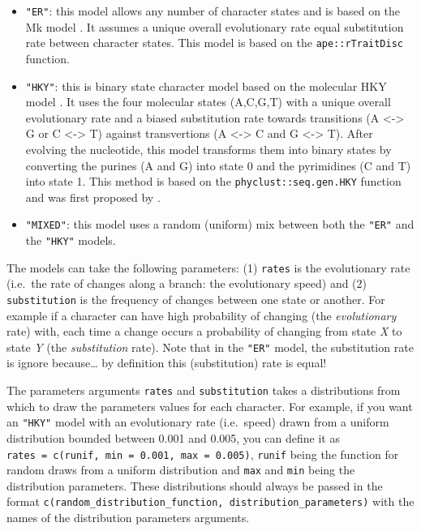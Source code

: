 \documentclass[]{book}
\providecommand{\tightlist}{%
  \setlength{\itemsep}{0pt}\setlength{\parskip}{0pt}}
\begin{document}
\begin{itemize}
\tightlist
\item
  \texttt{"ER"}: this model allows any number of character states and is based on the Mk model \citep{lewisa2001}. It assumes a unique overall evolutionary rate equal substitution rate between character states. This model is based on the \texttt{ape::rTraitDisc} function.
\item
  \texttt{"HKY"}: this is binary state character model based on the molecular HKY model \citep{HKY85}. It uses the four molecular states (A,C,G,T) with a unique overall evolutionary rate and a biased substitution rate towards transitions (A \textless{}-\textgreater{} G or C \textless{}-\textgreater{} T) against transvertions (A \textless{}-\textgreater{} C and G \textless{}-\textgreater{} T). After evolving the nucleotide, this model transforms them into binary states by converting the purines (A and G) into state 0 and the pyrimidines (C and T) into state 1. This method is based on the \texttt{phyclust::seq.gen.HKY} function and was first proposed by \citet{OReilly2016}.
\item
  \texttt{"MIXED"}: this model uses a random (uniform) mix between both the \texttt{"ER"} and the \texttt{"HKY"} models.
\end{itemize}

The models can take the following parameters:
(1) \texttt{rates} is the evolutionary rate (i.e.~the rate of changes along a branch: the evolutionary speed) and (2) \texttt{substitution} is the frequency of changes between one state or another.
For example if a character can have high probability of changing (the \emph{evolutionary} rate) with, each time a change occurs a probability of changing from state \emph{X} to state \emph{Y} (the \emph{substitution} rate).
Note that in the \texttt{"ER"} model, the substitution rate is ignore because\ldots{} by definition this (substitution) rate is equal!

The parameters arguments \texttt{rates} and \texttt{substitution} takes a distributions from which to draw the parameters values for each character.
For example, if you want an \texttt{"HKY"} model with an evolutionary rate (i.e.~speed) drawn from a uniform distribution bounded between 0.001 and 0.005, you can define it as \texttt{rates\ =\ c(runif,\ min\ =\ 0.001,\ max\ =\ 0.005)}, \texttt{runif} being the function for random draws from a uniform distribution and \texttt{max} and \texttt{min} being the distribution parameters.
These distributions should always be passed in the format \texttt{c(random\_distribution\_function,\ distribution\_parameters)} with the names of the distribution parameters arguments.
\end{document}
